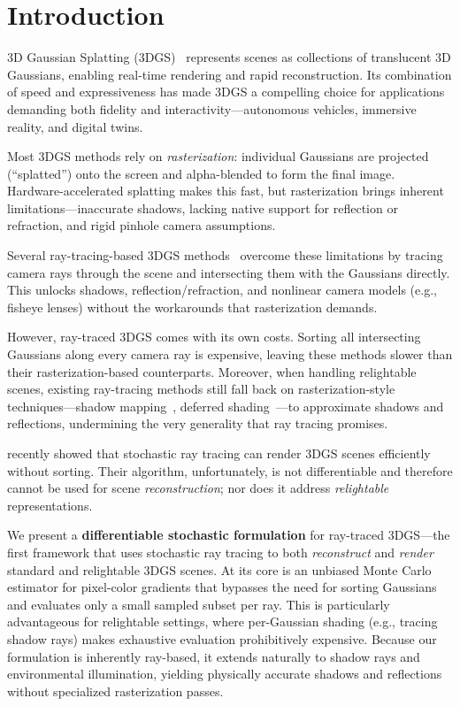 \section{Introduction}
\label{sec:intro}
%
3D Gaussian Splatting (3DGS)~\cite{kerbl20233d} represents scenes as collections of translucent 3D Gaussians, enabling real-time rendering and rapid reconstruction.
Its combination of speed and expressiveness has made 3DGS a compelling choice for applications demanding both fidelity and interactivity---autonomous vehicles, immersive reality, and digital twins.

Most 3DGS methods rely on \emph{rasterization}: individual Gaussians are projected (``splatted'') onto the screen and alpha-blended to form the final image.
Hardware-accelerated splatting makes this fast, but rasterization brings inherent limitations---inaccurate shadows, lacking native support for reflection or refraction, and rigid pinhole camera assumptions.

Several ray-tracing-based 3DGS methods~\cite{loccoz20243dgrt, RaySplats, mai2024everexactvolumetricellipsoid} overcome these limitations by tracing camera rays through the scene and intersecting them with the Gaussians directly.
This unlocks shadows, reflection/refraction, and nonlinear camera models (e.g., fisheye lenses) without the workarounds that rasterization demands.

However, ray-traced 3DGS comes with its own costs.
Sorting all intersecting Gaussians along every camera ray is expensive, leaving these methods slower than their rasterization-based counterparts.
Moreover, when handling relightable scenes, existing ray-tracing methods still fall back on rasterization-style techniques---shadow mapping~\cite{williams1978casting}, deferred shading~\cite{deering1988triangle}---to approximate shadows and reflections, undermining the very generality that ray tracing promises.

\citet{Sun2025} recently showed that stochastic ray tracing can render 3DGS scenes efficiently without sorting.
Their algorithm, unfortunately, is not differentiable and therefore cannot be used for scene \emph{reconstruction}; nor does it address \emph{relightable} representations.

We present a \textbf{differentiable stochastic formulation} for ray-traced 3DGS---the first framework that uses stochastic ray tracing to both \emph{reconstruct} and \emph{render} standard and relightable 3DGS scenes.
At its core is an unbiased Monte Carlo estimator for pixel-color gradients that bypasses the need for sorting Gaussians and evaluates only a small sampled subset per ray.
This is particularly advantageous for relightable settings, where per-Gaussian shading (e.g., tracing shadow rays) makes exhaustive evaluation prohibitively expensive.
Because our formulation is inherently ray-based, it extends naturally to shadow rays and environmental illumination, yielding physically accurate shadows and reflections without specialized rasterization passes.

